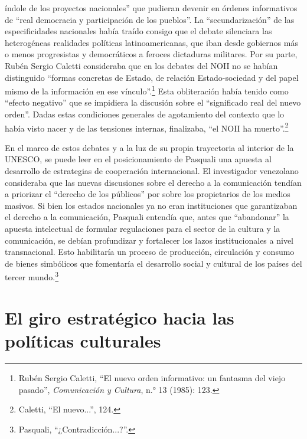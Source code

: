 \documentclass{tufte-handout}
\begin{document}
índole de los proyectos nacionales'' que pudieran devenir en órdenes
informativos de ``real democracia y participación de los pueblos''. La
``secundarización'' de las especificidades nacionales había traído
consigo que el debate silenciara las heterogéneas realidades políticas
latinoamericanas, que iban desde gobiernos más o menos progresistas y
democráticos a feroces dictaduras militares. Por su parte, Rubén Sergio
Caletti consideraba que en los debates del NOII no se habían distinguido
``formas concretas de Estado, de relación Estado-sociedad y del papel
mismo de la información en ese vínculo''.\footnote{Rubén Sergio Caletti,
  ``El nuevo orden informativo: un fantasma del viejo pasado'',
  \emph{Comunicación y Cultura}, n.° 13 (1985): 123.} Esta obliteración
había tenido como ``efecto negativo'' que se impidiera la discusión
sobre el ``significado real del nuevo orden''. Dadas estas condiciones
generales de agotamiento del contexto que lo había visto nacer y de las
tensiones internas, finalizaba, ``el NOII ha muerto''.\footnote{Caletti,
  ``El nuevo...'', 124.}

En el marco de estos debates y a la luz de su propia trayectoria al
interior de la UNESCO, se puede leer en el posicionamiento de Pasquali
una apuesta al desarrollo de estrategias de cooperación internacional.
El investigador venezolano consideraba que las nuevas discusiones sobre
el derecho a la comunicación tendían a priorizar el ``derecho de los
públicos'' por sobre los propietarios de los medios masivos. Si bien los
estados nacionales ya no eran instituciones que garantizaban el derecho
a la comunicación, Pasquali entendía que, antes que ``abandonar'' la
apuesta intelectual de formular regulaciones para el sector de la
cultura y la comunicación, se debían profundizar y fortalecer los lazos
institucionales a nivel transnacional. Esto habilitaría un proceso de
producción, circulación y consumo de bienes simbólicos que fomentaría el
desarrollo social y cultural de los países del tercer mundo.\footnote{Pasquali,
  ``¿Contradicción...?''.}

\hypertarget{el-giro-estratgico-hacia-las-polticas-culturales}{%
\section{El giro estratégico hacia las políticas
culturales}\label{el-giro-estratgico-hacia-las-polticas-culturales}}
\end{document}
